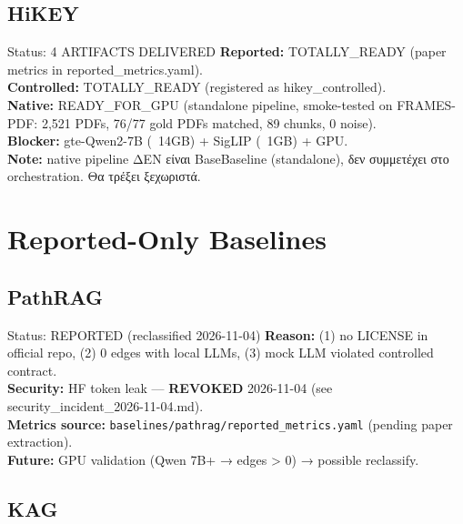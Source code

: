 \documentclass[11pt,a4paper]{article}
\begin{document}
\subsection{HiKEY}

\begin{statusbox}{Status: 4 ARTIFACTS DELIVERED}
\textbf{Reported:} TOTALLY\_READY (paper metrics in reported\_metrics.yaml). \\
\textbf{Controlled:} TOTALLY\_READY (registered as hikey\_controlled). \\
\textbf{Native:} READY\_FOR\_GPU (standalone pipeline, smoke-tested on FRAMES-PDF: 2,521 PDFs, 76/77 gold PDFs matched, 89 chunks, 0 noise). \\
\textbf{Blocker:} gte-Qwen2-7B (~14GB) + SigLIP (~1GB) + GPU. \\
\textbf{Note:} native pipeline ΔΕΝ είναι BaseBaseline (standalone), δεν συμμετέχει στο orchestration. Θα τρέξει ξεχωριστά.
\end{statusbox}

\section{Reported-Only Baselines}

\subsection{PathRAG}

\begin{warnbox}{Status: REPORTED (reclassified 2026-11-04)}
\textbf{Reason:} (1) no LICENSE in official repo, (2) 0 edges with local LLMs, (3) mock LLM violated controlled contract. \\
\textbf{Security:} HF token leak --- \textbf{REVOKED} 2026-11-04 (see security\_incident\_2026-11-04.md). \\
\textbf{Metrics source:} \texttt{baselines/pathrag/reported\_metrics.yaml} (pending paper extraction). \\
\textbf{Future:} GPU validation (Qwen 7B+ → edges > 0) → possible reclassify.
\end{warnbox}

\subsection{KAG}
\end{document}
